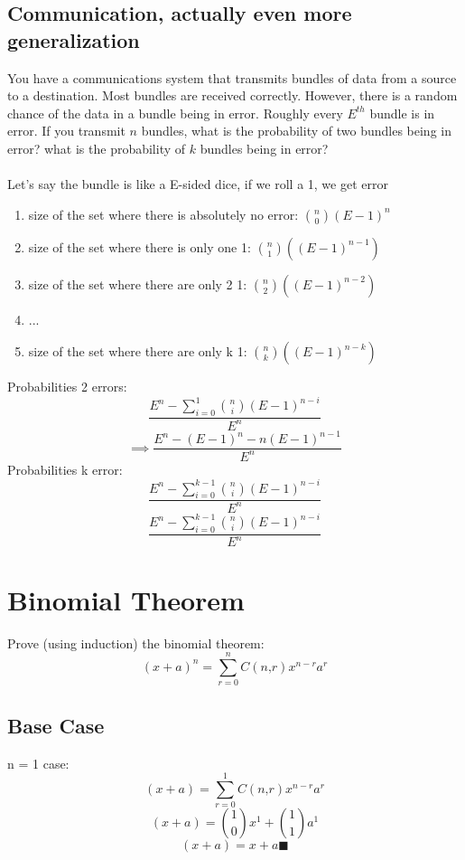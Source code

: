 \documentclass[a4paper,12pt]{article}
\begin{document}
\subsection{Communication, actually even more generalization}
You have a communications system that transmits bundles of data
from a source to a destination.  Most bundles are received correctly.
However, there is a random chance of the data in a bundle being in
error.  Roughly every $E^{th}$ bundle is in error.  If you transmit
$n$ bundles, what is the probability of two bundles being
in error?  what is the probability of $k$ bundles being in
error?\\
\bigskip\\
Let's say the bundle is like a E-sided dice, if we roll a 1, we get error
\begin{enumerate}
  \item{size of the set where there is absolutely no error: $\binom{n}{0}(E-1)^n$}
  \item{size of the set where there is only one 1: $\binom{n}{1}((E-1)^{n-1})$}
  \item{size of the set where there are only 2 1: $\binom{n}{2}((E-1)^{n-2})$} 
  \item{...}
  \item{size of the set where there are only k 1: $\binom{n}{k}((E-1)^{n-k})$} 
\end{enumerate}
Probabilities 2 errors: \\
\[\frac{ E^n - \sum ^1 _{i=0} \binom{n}{i}(E-1)^{n-i}} {E^n}\]
\[\implies \frac{ E^n - (E-1)^{n} - n(E-1)^{n-1} }{E^n}\]
Probabilities k error: \\
\[\frac{ E^n - \sum ^{k-1} _{i=0} \binom{n}{i}(E-1)^{n-i}} {E^n}\]
\[\frac{ E^n - \sum ^{k-1} _{i=0} \binom{n}{i}(E-1)^{n-i}} {E^n}\]
\pagebreak
\section{Binomial Theorem}
Prove (using induction) the binomial theorem:
\[
(x+a)^n = \sum_{r=0}^n C(n‚ r)x^{n-r}a^r
\]
\subsection{Base Case}
n = 1 case:\\
\[(x+a) = \sum_{r=0}^1 C(n‚ r)x^{n-r}a^r\]
\[(x+a) = \binom{1}{0} x^{1} + \binom{1}{1}  a^1\]
\[(x+a) = x+a \blacksquare \]
\end{document}
